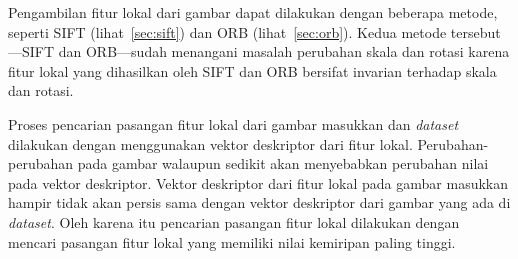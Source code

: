 Pengambilan fitur lokal dari gambar dapat dilakukan dengan beberapa metode, seperti SIFT (lihat~\ref{sec:sift}) dan ORB (lihat~\ref{sec:orb}). Kedua metode tersebut---SIFT dan ORB---sudah menangani masalah perubahan skala dan rotasi karena fitur lokal yang dihasilkan oleh SIFT dan ORB bersifat invarian terhadap skala dan rotasi.

Proses pencarian pasangan fitur lokal dari gambar masukkan dan \textit{dataset} dilakukan dengan menggunakan vektor deskriptor dari fitur lokal. Perubahan-perubahan pada gambar walaupun sedikit akan menyebabkan perubahan nilai pada vektor deskriptor. Vektor deskriptor dari fitur lokal pada gambar masukkan hampir tidak akan persis sama dengan vektor deskriptor dari gambar yang ada di \textit{dataset}. Oleh karena itu pencarian pasangan fitur lokal dilakukan dengan mencari pasangan fitur lokal yang memiliki nilai kemiripan paling tinggi.

